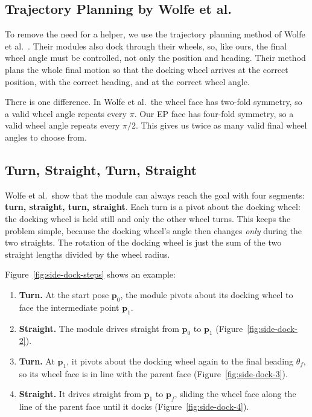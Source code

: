 \documentclass[12pt,a4paper]{article}
\begin{document}
\subsection{Trajectory Planning by Wolfe et al.}

To remove the need for a helper, we use the trajectory planning method of Wolfe et al.\ \cite{wolfe2010}. Their modules also dock through their wheels, so, like ours, the final wheel angle must be controlled, not only the position and heading. Their method plans the whole final motion so that the docking wheel arrives at the correct position, with the correct heading, and at the correct wheel angle.

There is one difference. In Wolfe et al.\ the wheel face has two-fold symmetry, so a valid wheel angle repeats every $\pi$. Our EP face has four-fold symmetry, so a valid wheel angle repeats every $\pi/2$. This gives us twice as many valid final wheel angles to choose from.

\subsection{Turn, Straight, Turn, Straight}

Wolfe et al.\ show that the module can always reach the goal with four segments: \textbf{turn, straight, turn, straight}. Each turn is a pivot about the docking wheel: the docking wheel is held still and only the other wheel turns. This keeps the problem simple, because the docking wheel's angle then changes \emph{only} during the two straights. The rotation of the docking wheel is just the sum of the two straight lengths divided by the wheel radius.

Figure~\ref{fig:side-dock-steps} shows an example:

\begin{enumerate}[topsep=2pt,itemsep=2pt,parsep=0pt,leftmargin=1.5em]
\item \textbf{Turn.} At the start pose $\mathbf{p}_0$, the module pivots about its docking wheel to face the intermediate point $\mathbf{p}_1$.
\item \textbf{Straight.} The module drives straight from $\mathbf{p}_0$ to $\mathbf{p}_1$ (Figure~\ref{fig:side-dock-2}).
\item \textbf{Turn.} At $\mathbf{p}_1$, it pivots about the docking wheel again to the final heading $\theta_f$, so its wheel face is in line with the parent face (Figure~\ref{fig:side-dock-3}).
\item \textbf{Straight.} It drives straight from $\mathbf{p}_1$ to $\mathbf{p}_f$, sliding the wheel face along the line of the parent face until it docks (Figure~\ref{fig:side-dock-4}).
\end{enumerate}
\end{document}
